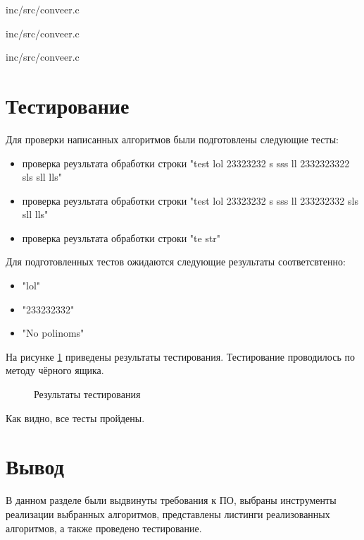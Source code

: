 \newpage
\begin{lstinputlisting}[
	caption={Реализация алгоритма первой ленты конвейера},
	label={conveer1},
	style={c},
	linerange={1-25},
	]{inc/src/conveer.c}
\end{lstinputlisting}

\newpage
\begin{lstinputlisting}[
	caption={Реализация алгоритма второй ленты конвейера},
	label={conveer2},
	style={c},
	linerange={27-51},
	]{inc/src/conveer.c}
\end{lstinputlisting}

\newpage
\begin{lstinputlisting}[
	caption={Реализация алгоритма третьей ленты конвейера},
	label={conveer3},
	style={c},
	linerange={53-79},
	]{inc/src/conveer.c}
\end{lstinputlisting}

\section{Тестирование}
Для проверки написанных алгоритмов были подготовлены следующие тесты:
\begin{itemize}
	\item проверка реузльтата обработки строки "test lol 23323232 s sss ll 2332323322 sls sll lls"
	\item проверка реузльтата обработки строки "test lol 23323232 s sss ll 233232332 sls sll lls"
	\item проверка реузльтата обработки строки "te str"
\end{itemize}

Для подготовленных тестов ожидаются следующие результаты соответсвтенно:
\begin{itemize}
	\item "lol"
	\item "233232332"
	\item "No polinoms"
\end{itemize}

На рисунке \ref{tests} приведены результаты тестирования. Тестирование проводилось по методу чёрного ящика.

\begin{figure}[h]
	\caption{Результаты тестирования}
	\label{tests}
\end{figure}

Как видно, все тесты пройдены.

\section{Вывод}
В данном разделе были выдвинуты требования к ПО, выбраны инструменты реализации выбранных алгоритмов, представлены листинги реализованных алгоритмов, а также проведено тестирование.